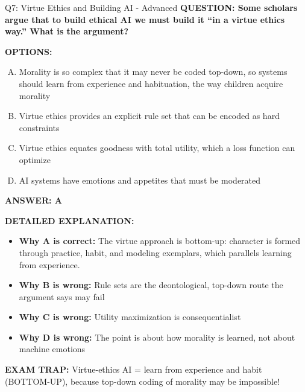 \documentclass[8pt]{beamer}
\begin{document}
\begin{frame}[shrink=6]{Q7: Virtue Ethics and Building AI - Advanced}
\fontsize{6.5}{7.5}\selectfont
\textbf{QUESTION: Some scholars argue that to build ethical AI we must build it ``in a virtue ethics way.'' What is the argument?}

\vspace{0.1cm}
\textbf{OPTIONS:}
\begin{enumerate}[A.]
\item Morality is so complex that it may never be coded top-down, so systems should learn from experience and habituation, the way children acquire morality
\item Virtue ethics provides an explicit rule set that can be encoded as hard constraints
\item Virtue ethics equates goodness with total utility, which a loss function can optimize
\item AI systems have emotions and appetites that must be moderated
\end{enumerate}

\vspace{0.1cm}
\textcolor{myblue}{\textbf{ANSWER: A}}

\vspace{0.1cm}
\textbf{DETAILED EXPLANATION:}
\begin{itemize}
\item \textbf{Why A is correct:} The virtue approach is bottom-up: character is formed through practice, habit, and modeling exemplars, which parallels learning from experience.
\item \textbf{Why B is wrong:} Rule sets are the deontological, top-down route the argument says may fail
\item \textbf{Why C is wrong:} Utility maximization is consequentialist
\item \textbf{Why D is wrong:} The point is about how morality is learned, not about machine emotions
\end{itemize}

\textcolor{myred}{\textbf{EXAM TRAP:}} Virtue-ethics AI = learn from experience and habit (BOTTOM-UP), because top-down coding of morality may be impossible!
\end{frame}
\end{document}
